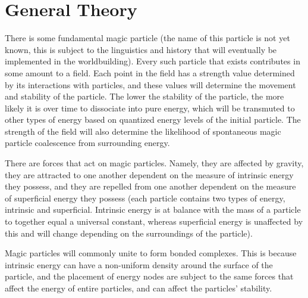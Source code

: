\documentclass[a4paper]{article}
\begin{document}
\section{General Theory}
There is some fundamental magic particle (the name of this particle is not yet known, this is subject to the linguistics and history that will eventually be implemented in the worldbuilding). Every such particle that exists contributes in some amount to a field. Each point in the field has a strength value determined by its interactions with particles, and these values will determine the movement and stability of the particle. The lower the stability of the particle, the more likely it is over time to dissociate into pure energy, which will be transmuted to other types of energy based on quantized energy levels of the initial particle. The strength of the field will also determine the likelihood of spontaneous magic particle coalescence from surrounding energy.

There are forces that act on magic particles. Namely, they are affected by gravity, they are attracted to one another dependent on the measure of intrinsic energy they possess, and they are repelled from one another dependent on the measure of superficial energy they possess (each particle contains two types of energy, intrinsic and superficial. Intrinsic energy is at balance with the mass of a particle to together equal a universal constant, whereas superficial energy is unaffected by this and will change depending on the surroundings of the particle).

Magic particles will commonly unite to form bonded complexes. This is because intrinsic energy can have a non-uniform density around the surface of the particle, and the placement of energy nodes are subject to the same forces that affect the energy of entire particles, and can affect the particles' stability.
\end{document}
